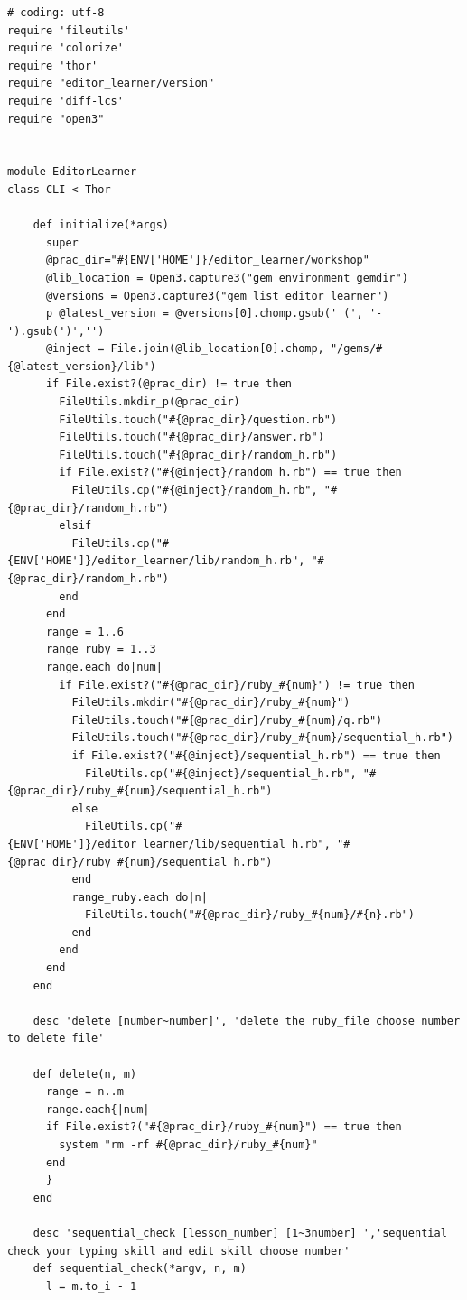 \documentclass[11pt,dvipdfmx]{jsarticle}
\begin{document}
    \begin{verbatim}
# coding: utf-8
require 'fileutils'
require 'colorize'
require 'thor'
require "editor_learner/version"
require 'diff-lcs'
require "open3"


module EditorLearner
class CLI < Thor

    def initialize(*args)
      super
      @prac_dir="#{ENV['HOME']}/editor_learner/workshop"
      @lib_location = Open3.capture3("gem environment gemdir")
      @versions = Open3.capture3("gem list editor_learner")
      p @latest_version = @versions[0].chomp.gsub(' (', '-').gsub(')','')
      @inject = File.join(@lib_location[0].chomp, "/gems/#{@latest_version}/lib")
      if File.exist?(@prac_dir) != true then
        FileUtils.mkdir_p(@prac_dir)
        FileUtils.touch("#{@prac_dir}/question.rb")
        FileUtils.touch("#{@prac_dir}/answer.rb")
        FileUtils.touch("#{@prac_dir}/random_h.rb")
        if File.exist?("#{@inject}/random_h.rb") == true then
          FileUtils.cp("#{@inject}/random_h.rb", "#{@prac_dir}/random_h.rb")
        elsif  
          FileUtils.cp("#{ENV['HOME']}/editor_learner/lib/random_h.rb", "#{@prac_dir}/random_h.rb")
        end
      end
      range = 1..6
      range_ruby = 1..3
      range.each do|num|
        if File.exist?("#{@prac_dir}/ruby_#{num}") != true then
          FileUtils.mkdir("#{@prac_dir}/ruby_#{num}")
          FileUtils.touch("#{@prac_dir}/ruby_#{num}/q.rb")
          FileUtils.touch("#{@prac_dir}/ruby_#{num}/sequential_h.rb")
          if File.exist?("#{@inject}/sequential_h.rb") == true then
            FileUtils.cp("#{@inject}/sequential_h.rb", "#{@prac_dir}/ruby_#{num}/sequential_h.rb")
          else
            FileUtils.cp("#{ENV['HOME']}/editor_learner/lib/sequential_h.rb", "#{@prac_dir}/ruby_#{num}/sequential_h.rb")
          end
          range_ruby.each do|n|
            FileUtils.touch("#{@prac_dir}/ruby_#{num}/#{n}.rb")
          end
        end
      end
    end
    
    desc 'delete [number~number]', 'delete the ruby_file choose number to delete file'
    
    def delete(n, m)
      range = n..m
      range.each{|num|
      if File.exist?("#{@prac_dir}/ruby_#{num}") == true then
        system "rm -rf #{@prac_dir}/ruby_#{num}"
      end
      }
    end

    desc 'sequential_check [lesson_number] [1~3number] ','sequential check your typing skill and edit skill choose number'
    def sequential_check(*argv, n, m)
      l = m.to_i - 1
     

\end{verbatim}
\end{document}
